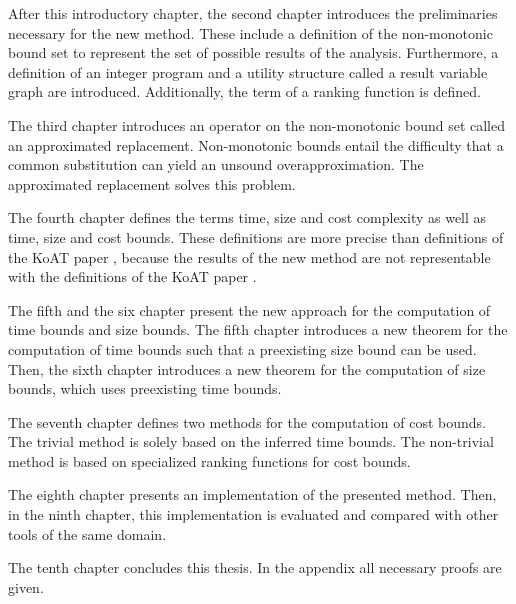 After this introductory chapter, the second chapter introduces the preliminaries necessary for the new method.
These include a definition of the non-monotonic bound set to represent the set of possible results of the analysis.
Furthermore, a definition of an integer program and a utility structure called a result variable graph are introduced.
Additionally, the term of a ranking function is defined.

The third chapter introduces an operator on the non-monotonic bound set called an approximated replacement.
Non-monotonic bounds entail the difficulty that a common substitution can yield an unsound overapproximation.
The approximated replacement solves this problem.

The fourth chapter defines the terms time, size and cost complexity as well as time, size and cost bounds.
These definitions are more precise than definitions of the KoAT paper \cite{koat}, because the results of the new method are not representable with the definitions of the KoAT paper \cite{koat}.

The fifth and the six chapter present the new approach for the computation of time bounds and size bounds.
The fifth chapter introduces a new theorem for the computation of time bounds such that a preexisting size bound can be used.
Then, the sixth chapter introduces a new theorem for the computation of size bounds, which uses preexisting time bounds.

The seventh chapter defines two methods for the computation of cost bounds.
The trivial method is solely based on the inferred time bounds.
The non-trivial method is based on specialized ranking functions for cost bounds.

The eighth chapter presents an implementation of the presented method.
Then, in the ninth chapter, this implementation is evaluated and compared with other tools of the same domain.

The tenth chapter concludes this thesis.
In the appendix all necessary proofs are given.
